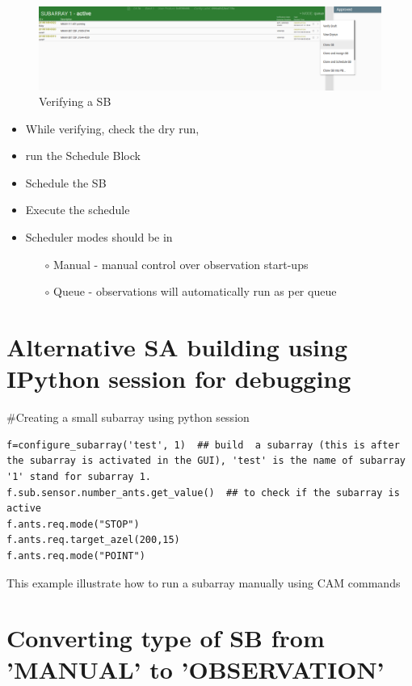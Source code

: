 \begin{figure}[!thb]
	\centering
	\includegraphics[scale=0.25]{Chapters/images/image12.png}
	
	\caption{ Verifying a SB }
	\label{fig:image12}
\end{figure}
\begin{itemize}
\item While verifying, check the dry run,
\item run the Schedule Block 
\item Schedule the SB
\item Execute the schedule
\item Scheduler modes should be in 
\begin{itemize}
\item[$\circ$] Manual - manual control over observation start-ups
\item[$\circ$] Queue - observations will automatically run as per queue
\end{itemize}
\end{itemize}
\section{ Alternative SA building using IPython session for debugging}

\#Creating a small subarray using python session
\begin{lstlisting}[style=DOS]
f=configure_subarray('test', 1)  ## build  a subarray (this is after the subarray is activated in the GUI), 'test' is the name of subarray '1' stand for subarray 1.
f.sub.sensor.number_ants.get_value()  ## to check if the subarray is active
f.ants.req.mode("STOP")
f.ants.req.target_azel(200,15)
f.ants.req.mode("POINT")
\end{lstlisting} 


This example illustrate how to run a subarray manually using CAM commands

\section{ Converting type of SB from 'MANUAL' to 'OBSERVATION'}

